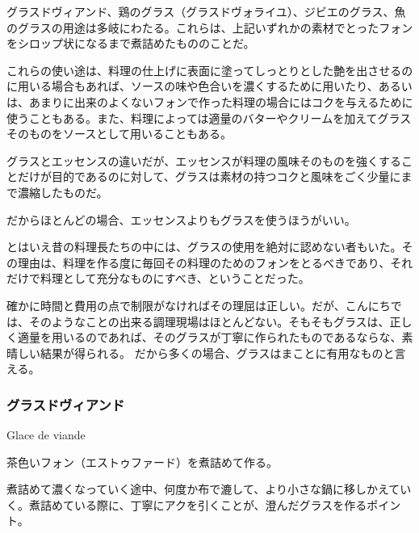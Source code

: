 \begin{recette}

グラスドヴィアンド、鶏のグラス（グラスドヴォライユ）、ジビエのグラス、魚のグラスの用途は多岐にわたる。これらは、上記いずれかの素材でとったフォンをシロップ状になるまで煮詰めたもののことだ。

これらの使い途は、料理の仕上げに表面に塗ってしっとりとした艶を出させるのに用いる場合もあれば、ソースの味や色合いを濃くするために用いたり、あるいは、あまりに出来のよくないフォンで作った料理の場合にはコクを与えるために使うこともある。また、料理によっては適量のバターやクリームを加えてグラスそのものをソースとして用いることもある。

グラスとエッセンスの違いだが、エッセンスが料理の風味そのものを強くすることだけが目的であるのに対して、グラスは素材の持つコクと風味をごく少量にまで濃縮したものだ。

だからほとんどの場合、エッセンスよりもグラスを使うほうがいい。

とはいえ昔の料理長たちの中には、グラスの使用を絶対に認めない者もいた。その理由は、料理を作る度に毎回その料理のためのフォンをとるべきであり、それだけで料理として充分なものにすべき、ということだった。

確かに時間と費用の点で制限がなければその理屈は正しい。だが、こんにちでは、そのようなことの出来る調理現場はほとんどない。そもそもグラスは、正しく適量を用いるのであれば、そのグラスが丁寧に作られたものであるならな、素晴しい結果が得られる。
だから多くの場合、グラスはまことに有用なものと言える。

\atoaki{}

\hypertarget{glace-de-viande}{%
\subsubsection{グラスドヴィアンド}\label{glace-de-viande}}

\begin{frsubenv}

Glace de viande

\end{frsubenv}


茶色いフォン（エストゥファード）を煮詰めて作る。

煮詰めて濃くなっていく途中、何度か布で漉して、より小さな鍋に移しかえていく。煮詰めている際に、丁寧にアクを引くことが、澄んだグラスを作るポイント。


\end{recette}
